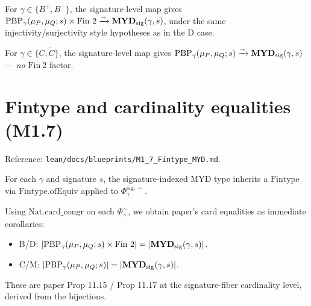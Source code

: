 \begin{theorem}
  \label{thm:Phi_B_equiv}
  \leanok
  For $\gamma \in \{B^+, B^-\}$, the signature-level map gives
  $\mathrm{PBP}_\gamma(\mu_P,\mu_Q;s) \times \mathrm{Fin}\ 2
  \xrightarrow{\sim} \mathbf{MYD}_{\mathrm{sig}}(\gamma,s)$, under the same
  injectivity/surjectivity style hypotheses as in the D case.
\end{theorem}

\begin{theorem}
  \label{thm:Phi_CM_equiv}
  \leanok
  For $\gamma \in \{C, \tilde{C}\}$, the signature-level map gives
  $\mathrm{PBP}_\gamma(\mu_P,\mu_Q;s)
  \xrightarrow{\sim} \mathbf{MYD}_{\mathrm{sig}}(\gamma,s)$ --- \emph{no}
  $\mathrm{Fin}\ 2$ factor.
\end{theorem}


\section{Fintype and cardinality equalities (M1.7)}

Reference: \texttt{lean/docs/blueprints/M1\_7\_Fintype\_MYD.md}.

\begin{definition}
  \label{def:fintype_MYD}
  \leanok
  For each $\gamma$ and signature $s$, the signature-indexed MYD type
  inherits a $\mathrm{Fintype}$ via $\mathrm{Fintype.ofEquiv}$ applied to
  $\Phi_\gamma^{\mathrm{sig},\sim}$.
\end{definition}

\begin{theorem}
  \label{thm:card_PBPSet_eq_MYD}
  \leanok
  Using $\mathrm{Nat.card\_congr}$ on each $\Phi_\gamma^{\sim}$, we obtain paper's card equalities as immediate corollaries:
  \begin{itemize}
    \item B/D: $|\mathrm{PBP}_\gamma(\mu_P,\mu_Q;s) \times \mathrm{Fin}\ 2|
          = |\mathbf{MYD}_{\mathrm{sig}}(\gamma,s)|$.
    \item C/M: $|\mathrm{PBP}_\gamma(\mu_P,\mu_Q;s)|
          = |\mathbf{MYD}_{\mathrm{sig}}(\gamma,s)|$.
  \end{itemize}
  These are paper Prop 11.15 / Prop 11.17 at the signature-fiber
  cardinality level, derived from the bijections.
\end{theorem}
